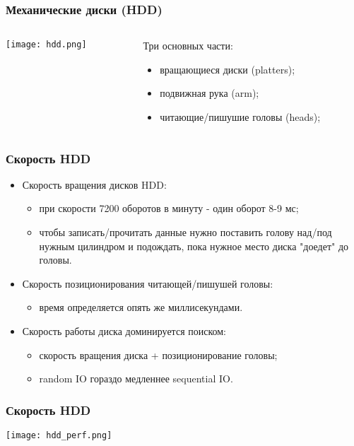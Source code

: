 \begin{frame}
\frametitle{Механические диски (HDD)}
\begin{columns}
  \begin{column}{.6\linewidth}
    \begin{center}
      \texttt{[image: hdd.png]}
    \end{center}
  \end{column}
  \begin{column}{.55\linewidth}
    Три основных части:
    \begin{itemize}
      \item вращающиеся диски (platters);
      \item подвижная рука (arm);
      \item читающие/пишушие головы (heads);
    \end{itemize}
  \end{column}
\end{columns}
\end{frame}

\begin{frame}
\frametitle{Скорость HDD}
\begin{itemize}
  \item Скорость вращения дисков HDD:
  \begin{itemize}
    \item при скорости 7200 оборотов в минуту - один оборот 8-9 мс;
    \item чтобы записать/прочитать данные нужно поставить голову над/под нужным
    цилиндром и подождать, пока нужное место диска "доедет" до головы.
  \end{itemize}
  \item Скорость позиционирования читающей/пишушей головы:
  \begin{itemize}
    \item время определяется опять же миллисекундами.
  \end{itemize}
  \item Скорость работы диска доминируется поиском:
  \begin{itemize}
    \item скорость вращения диска + позиционирование головы;
    \item random IO гораздо медленнее sequential IO.
  \end{itemize}
\end{itemize}
\end{frame}

\begin{frame}
\frametitle{Скорость HDD}
\begin{center}
  \texttt{[image: hdd\_perf.png]}
\end{center}
\end{frame}
